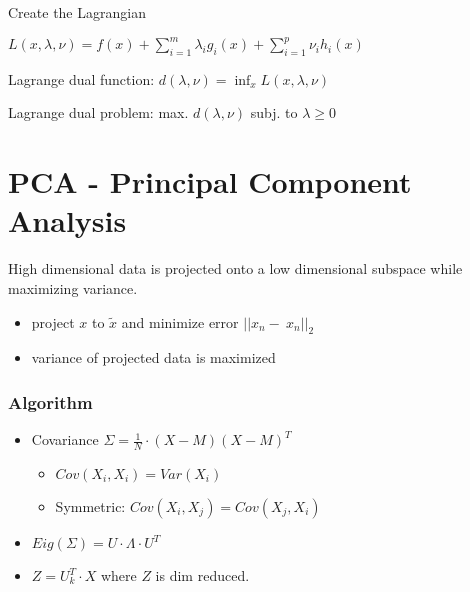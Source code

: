 \documentclass[11pt,twocolumn]{article}
\begin{document}
Create the Lagrangian

$L(x, \lambda, \nu) = f(x) + \sum_{i=1}^m{\lambda_i g_i(x) + \sum_{i=1}^p{\nu_i h_i(x)}}$

Lagrange dual function: $ d(\lambda, \nu) = \inf_{x} L (x,\lambda, \nu) $

Lagrange dual problem: max. $d(\lambda, \nu)$  subj. to $\lambda \geq 0$



\maketitle



\section{PCA - Principal Component Analysis}

High dimensional data is projected onto a low dimensional subspace while maximizing variance.

\begin{itemize}
\item project $x$ to $\tilde{x}$ and minimize error $|| x_n - ~x_n ||_2$
\item variance of projected data is maximized
\end{itemize}

\subsubsection{Algorithm}

\begin{itemize}
\item Covariance $\Sigma = \frac{1}{N} \cdot (  X - M ) ( X - M )^T$
\begin{itemize}
\item $Cov(X_i, X_i) = Var(X_i)$
\item Symmetric: $ Cov(X_i,X_j) = Cov(X_j, X_i)$
\end{itemize}
\item $Eig(\Sigma) = U \cdot \Lambda \cdot U^T$
\item $Z = U_k^T \cdot X$ where $Z$ is dim reduced.

\end{itemize}
\end{document}
